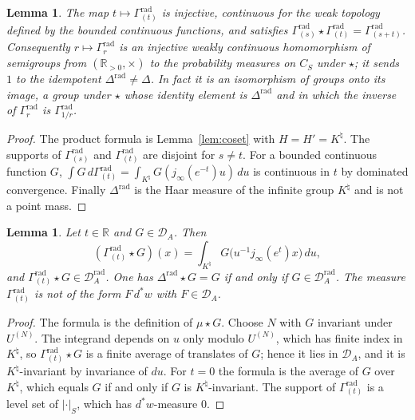 \documentclass[11pt]{amsart}
\newtheorem{lemma}[theorem]{Lemma}
\theoremstyle{definition}
\newcommand{\R}{\mathbb R}
\newcommand{\Knat}{K^{\natural}}
\newcommand{\Drad}{\mathcal D_A^{\mathrm{rad}}}
\newcommand{\DA}{\mathcal D_A}
\begin{document}
\begin{lemma}\label{lem:notideal}
The map $t\mapsto\Gamma^{\mathrm{rad}}_{(t)}$ is injective, continuous for the
weak topology defined by the bounded continuous functions, and satisfies
$\Gamma^{\mathrm{rad}}_{(s)}\star\Gamma^{\mathrm{rad}}_{(t)}
=\Gamma^{\mathrm{rad}}_{(s+t)}$. Consequently
$r\mapsto\Gamma_r^{\mathrm{rad}}$ is an injective weakly continuous
homomorphism of semigroups from $(\R_{>0},\times)$ to the probability
measures on $C_S$ under $\star$; it sends $1$ to the idempotent
$\Delta^{\mathrm{rad}}\ne\Delta$. In fact it is an isomorphism of groups
onto its image, a group under $\star$ whose identity element is
$\Delta^{\mathrm{rad}}$ and in which the inverse of
$\Gamma_r^{\mathrm{rad}}$ is $\Gamma_{1/r}^{\mathrm{rad}}$.
\end{lemma}

\begin{proof}
The product formula is Lemma~\ref{lem:coset} with $H=H'=\Knat$. The
supports of $\Gamma^{\mathrm{rad}}_{(s)}$ and $\Gamma^{\mathrm{rad}}_{(t)}$ are
disjoint for $s\ne t$. For a bounded continuous function $G$,
$\int G\,d\Gamma^{\mathrm{rad}}_{(t)}=\int_{\Knat}G(j_\infty(e^{-t})u)\,du$ is
continuous in $t$ by dominated convergence. Finally $\Delta^{\mathrm{rad}}$
is the Haar measure of the infinite group $\Knat$ and is not a point mass.
\end{proof}

\begin{lemma}\label{rem:multiplier}
Let $t\in\R$ and $G\in\DA$. Then
\[
  (\Gamma^{\mathrm{rad}}_{(t)}\star G)(x)
   =\int_{\Knat}G\bigl(u^{-1}j_\infty(e^{t})x\bigr)\,du ,
\]
and $\Gamma^{\mathrm{rad}}_{(t)}\star G\in\Drad$. One has
$\Delta^{\mathrm{rad}}\star G=G$ if and only if $G\in\Drad$. The measure
$\Gamma^{\mathrm{rad}}_{(t)}$ is not of the form $F\,d^*w$ with $F\in\DA$.
\end{lemma}

\begin{proof}
The formula is the definition of $\mu\star G$. Choose $N$ with $G$ invariant
under $U^{(N)}$. The integrand depends on $u$ only modulo $U^{(N)}$, which has finite
index in $\Knat$, so $\Gamma^{\mathrm{rad}}_{(t)}\star G$ is a finite average
of translates of $G$; hence it lies in $\DA$, and it is $\Knat$-invariant by
invariance of $du$. For $t=0$ the formula is the average of $G$ over $\Knat$,
which equals $G$ if and only if $G$ is $\Knat$-invariant. The support of
$\Gamma^{\mathrm{rad}}_{(t)}$ is a level set of $|\cdot|_S$, which has
$d^*w$-measure $0$.
\end{proof}
\end{document}

